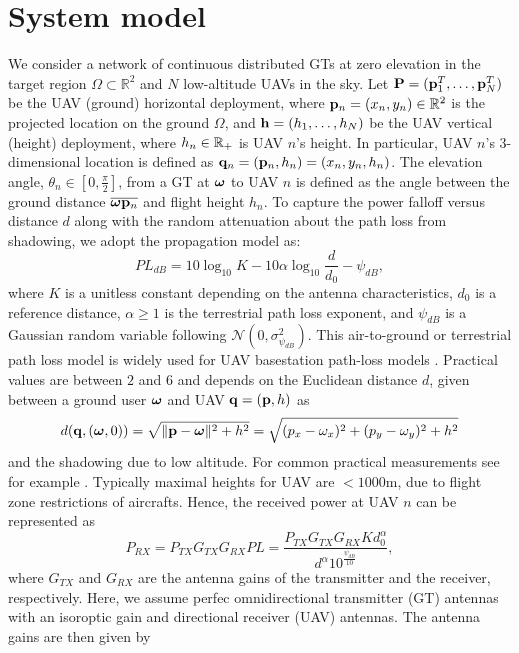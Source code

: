 \documentclass[smallabstract,smallcaptions]{dccpaper}
\newcounter{example}[section]
\newcommand{\bH}{\ensuremath{\vh}}          %
\begin{document}
\section{System model}\label{sec:model}
%
We consider a network of continuous distributed GTs at zero elevation in the target region $\Omega\subset\mathbb{R}^2$ and $N$
low-altitude UAVs in the sky.  Let $\mathbf P =({\mathbf p}_1^T,\dots,{\mathbf p}_N^T)$ be the UAV (ground) horizontal deployment, where
${\mathbf p}_n=(x_n, y_n)\in\mathbb{R}^2$ is the projected location on the ground $\Omega$, and $\bH=(h_1,\dots,h_N)$ be the
UAV vertical (height) deployment, where $h_n\in{\ensuremath{\mathbb R}}_+$ is UAV $n$'s height.  In particular, UAV $n$'s 3-dimensional
location is defined as ${\mathbf q}_n=({\mathbf p}_n,h_n)=(x_n,y_n, h_n)$.  The elevation angle, $\theta_n\in[0,\frac{\pi}{2}]$, from
a GT at $\boldsymbol{ \omega}$ to UAV $n$ is defined as the angle between the ground distance $\overline{\boldsymbol{ \omega} {\mathbf p}_n}$ and flight
height $h_n$. 
To capture the power falloff versus distance $d$ along with the random attenuation about the path loss from shadowing, we adopt the propagation
model \cite[(2.51)]{AG} as:
%
\begin{equation}
  PL_{dB}=10\log_{10}{K}-10\alpha\log_{10}{\frac{d}{d_0}}-\psi_{dB},
\end{equation}
%
where $K$ is a unitless constant depending on the antenna characteristics, $d_0$ is a reference distance, $\alpha\geq 1$
is the terrestrial path loss exponent, and $\psi_{dB}$ is a Gaussian random variable following
$\mathcal{N}\left(0,\sigma^2_{\psi_{dB}}\right)$. This air-to-ground or terrestrial path loss model is widely used for
UAV basestation path-loss models \cite{MSBD16a}. Practical values are between $2$ and $6$ and depends on the Euclidean distance $d$, given between a ground user $\boldsymbol{ \omega}$ and UAV ${\mathbf q}=({\mathbf p},h)$ as
%
\begin{align}
  d({\mathbf q},(\boldsymbol{ \omega},0))=\sqrt{\|{\mathbf p}-\boldsymbol{ \omega}\|^2+h^2}=\sqrt{(p_{x}-\omega_x)^2+(p_{y}-\omega_y)^2+h^2}\label{eq:eucd}
\end{align}
%
and the shadowing due to low altitude.  For common practical measurements see for example \cite{AG18}.  Typically
maximal heights for UAV are $<1000$m, due to flight zone restrictions of aircrafts.  Hence, the received power at
UAV $n$ can be represented as
%
\begin{equation}
  P_{RX}=P_{TX}G_{TX}G_{RX}PL=\frac{P_{TX}G_{TX}G_{RX}Kd^{\alpha}_0}{d^{\alpha}10^{\frac{\psi_{dB}}{10}}}, \label{eq:Prx}
\end{equation}
%
where $G_{TX}$ and $G_{RX}$ are the antenna gains of the transmitter and the receiver, respectively. Here, we assume perfec omnidirectional transmitter (GT) antennas with an isoroptic gain and directional receiver (UAV) antennas.  The antenna gains are then given by 
\end{document}
